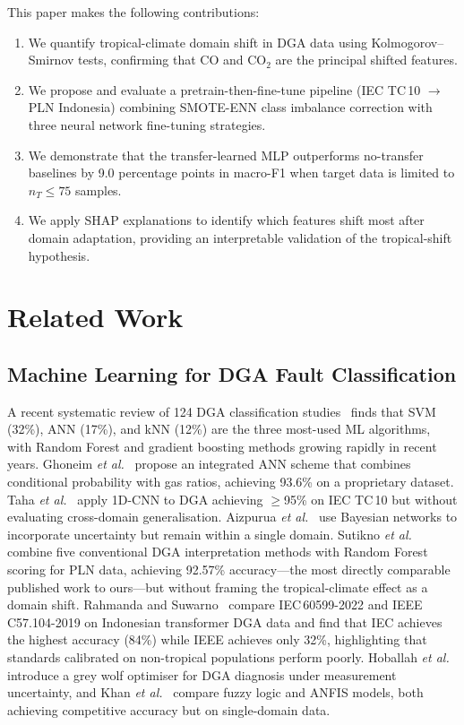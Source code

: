 \documentclass[conference]{IEEEtran}
\begin{document}
This paper makes the following contributions:
\begin{enumerate}
  \item We quantify tropical-climate domain shift in DGA data using
        Kolmogorov--Smirnov tests, confirming that CO and CO$_2$ are
        the principal shifted features.
  \item We propose and evaluate a pretrain-then-fine-tune pipeline
        (IEC TC\,10 $\rightarrow$ PLN Indonesia) combining
        SMOTE-ENN class imbalance correction with three neural network
        fine-tuning strategies.
  \item We demonstrate that the transfer-learned MLP outperforms
        no-transfer baselines by 9.0 percentage points in macro-F1
        when target data is limited to $n_T \leq 75$ samples.
  \item We apply SHAP explanations to identify which features
        shift most after domain adaptation, providing an interpretable
        validation of the tropical-shift hypothesis.
\end{enumerate}

\section{Related Work}
\label{sec:related}

\subsection{Machine Learning for DGA Fault Classification}
A recent systematic review of 124 DGA classification
studies~\cite{DladlaThango2025} finds that SVM (32\%), ANN (17\%),
and kNN (12\%) are the three most-used ML algorithms, with Random
Forest and gradient boosting methods growing rapidly in recent years.
Ghoneim \textit{et al.}~\cite{Ghoneim2016ANN} propose an integrated
ANN scheme that combines conditional probability with gas ratios,
achieving 93.6\% on a proprietary dataset.
Taha \textit{et al.}~\cite{Taha2021CNN} apply 1D-CNN to DGA
achieving $\geq$95\% on IEC TC\,10 but without evaluating
cross-domain generalisation.
Aizpurua \textit{et al.}~\cite{Aizpurua2018Bayes} use Bayesian
networks to incorporate uncertainty but remain within a single domain.
Sutikno \textit{et al.}~\cite{SutiknoPrasojo2024} combine five
conventional DGA interpretation methods with Random Forest scoring
for PLN data, achieving 92.57\% accuracy---the most directly
comparable published work to ours---but without framing the
tropical-climate effect as a domain shift.
Rahmanda and Suwarno~\cite{RahmandaSuwarno2022} compare
IEC\,60599-2022 and IEEE\,C57.104-2019 on Indonesian transformer
DGA data and find that IEC achieves the highest accuracy (84\%)
while IEEE achieves only 32\%, highlighting that standards calibrated
on non-tropical populations perform poorly.
Hoballah \textit{et al.}~\cite{Hoballah2020GWO} introduce a grey
wolf optimiser for DGA diagnosis under measurement uncertainty,
and Khan \textit{et al.}~\cite{Khan2015ANFIS} compare fuzzy logic
and ANFIS models, both achieving competitive accuracy but on
single-domain data.
\end{document}
